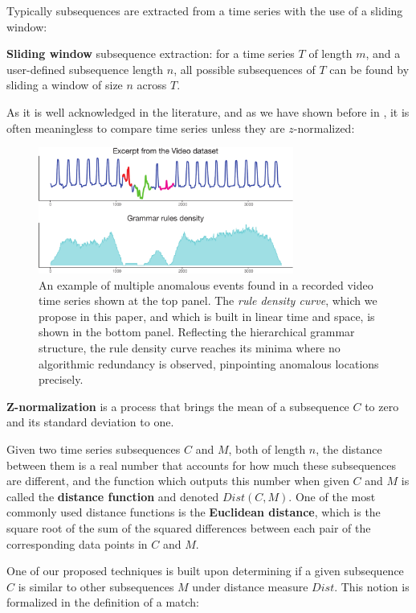 \documentclass{sig-alternate}
\begin{document}
Typically subsequences are extracted from a time series with the use of a sliding window:

\textbf{Sliding window} subsequence extraction: for a time series $T$ of length $m$, and a user-defined subsequence  length $n$, all possible subsequences of $T$ can be found by sliding a window of size $n$ across $T$.

As it is well acknowledged in the literature, and as we have shown before in \cite{sax}, it is often meaningless to compare time series unless they are $z$-normalized:

\begin{figure}[t]
  \centering
  \includegraphics[width=84mm]{ECG13.pdf}
  \caption{An example of multiple anomalous events found in a recorded video time series \cite{param_free} shown at the top panel. The \textit{rule density curve}, which we propose in this paper, and which is built in linear time and space, is shown in the bottom panel. Reflecting the hierarchical grammar structure, the rule density curve reaches its minima where no algorithmic redundancy is observed, pinpointing anomalous locations precisely.}
  \label{fig:video1}
\end{figure}
\textbf{Z-normalization} is a process that brings the mean of a subsequence $C$ to zero and its standard deviation to one.

Given two time series subsequences $C$ and $M$, both of length $n$, the distance between them is a real number that accounts for how much these subsequences are different, and the function which outputs this number when given $C$ and $M$ is called the \textbf{distance function} and denoted $Dist(C,M)$. One of the most commonly used distance functions is the \textbf{Euclidean distance}, which is the square root of the sum of the squared differences between each pair of the corresponding data points in $C$ and $M$.

One of our proposed techniques is built upon determining if a given subsequence $C$ is similar to other subsequences $M$ under distance measure $Dist$. This notion is formalized in the definition of a match:
\end{document}
